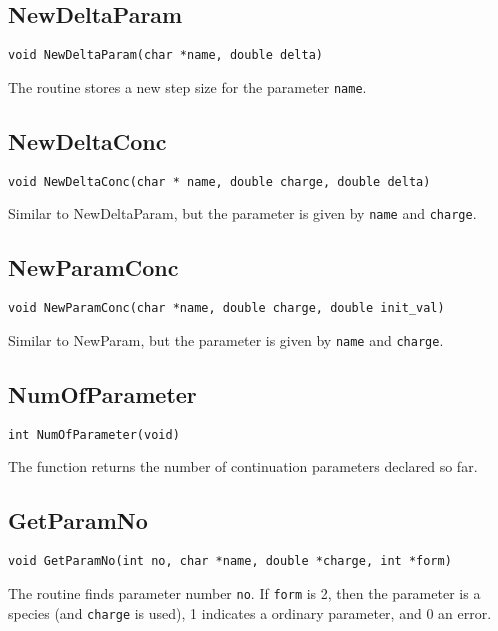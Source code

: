 \subsection{NewDeltaParam}
\begin{verbatim}
void NewDeltaParam(char *name, double delta)
\end{verbatim}

The routine stores a new step size for the parameter {\tt name}.

\subsection{NewDeltaConc}
\begin{verbatim}
void NewDeltaConc(char * name, double charge, double delta)
\end{verbatim}

Similar to NewDeltaParam, but the parameter is given by {\tt name} and
{\tt charge}.

\subsection{NewParamConc}
\begin{verbatim}
void NewParamConc(char *name, double charge, double init_val)
\end{verbatim}

Similar to NewParam, but the parameter is given by {\tt name} and
{\tt charge}. 

\subsection{NumOfParameter}
\begin{verbatim}
int NumOfParameter(void)
\end{verbatim}

The function returns the number of continuation parameters declared so
far.

\subsection{GetParamNo}
\begin{verbatim}
void GetParamNo(int no, char *name, double *charge, int *form)
\end{verbatim}

The routine finds parameter number {\tt no}. If {\tt form} is 2, then
the parameter is a species (and {\tt charge} is used), 1 indicates a
ordinary parameter, and 0 an error.

